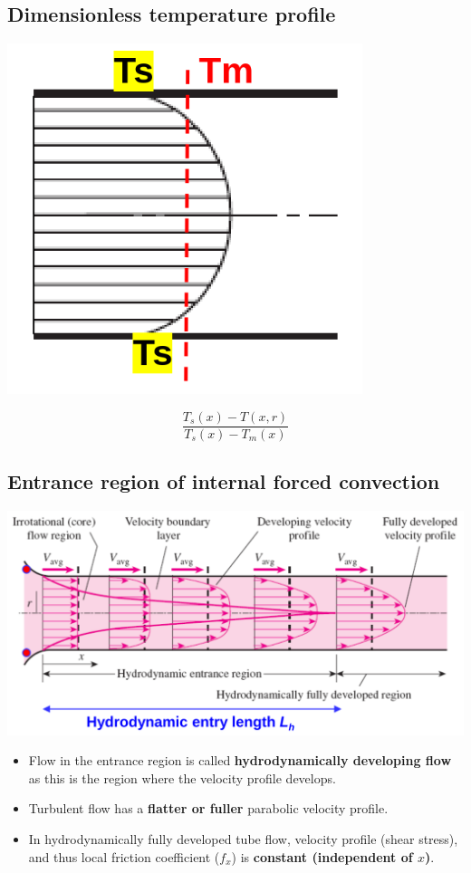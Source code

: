 \documentclass[11pt]{article}
\begin{document}
\subsection{Dimensionless temperature profile}
\label{sec:orgb0107de}
\begin{center}
\includegraphics[width=.9\linewidth]{./images/dimensionless-temperature-profile-diagram.png}
\end{center}
\[\frac{T_s (x) - T(x, r)}{T_s (x) - T_m (x)}\]
\subsection{Entrance region of internal forced convection}
\label{sec:org9358988}
\begin{center}
\includegraphics[width=.9\linewidth]{./images/entrance-region-of-internal-forced-convection.png}
\end{center}
\begin{itemize}
\item Flow in the entrance region is called \textbf{hydrodynamically developing flow} as this is the region where the velocity profile develops.
\item Turbulent flow has a \textbf{flatter or fuller} parabolic velocity profile.
\item In hydrodynamically fully developed tube flow, velocity profile (shear stress), and thus local friction coefficient (\(f_x\)) is \textbf{constant (independent of \(x\))}.
\end{itemize}
\end{document}
